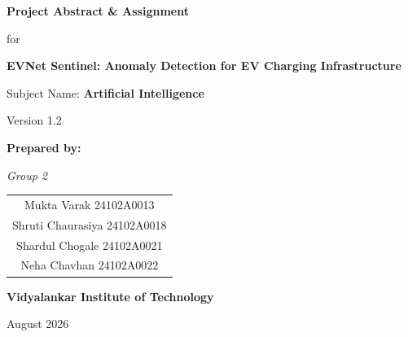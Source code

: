 \documentclass[12pt, a4paper]{article}
\begin{document}
\begin{titlepage}
    \centering
    \vspace*{1.5cm}

    {\Huge \bfseries Project Abstract \& Assignment\par}
    \vspace{0.4cm}
    {\large for\par}
    \vspace{0.6cm}

    {\Huge \bfseries EVNet Sentinel: Anomaly Detection for EV Charging Infrastructure\par}
    
    \vspace{1.5cm}
    {\Large Subject Name: \textbf{Artificial Intelligence}\par}
    \vspace{0.3cm}
    {\large Version 1.2\par}

    \vspace{2cm}

    {\Large \bfseries Prepared by:\par}
    \vspace{0.5cm}
    {\large \textit{Group 2}\par}
    \vspace{0.3cm}
    {\large
    \begin{tabular}{c}
        Mukta Varak \quad 24102A0013 \\
        Shruti Chaurasiya \quad 24102A0018 \\
        Shardul Chogale \quad 24102A0021 \\
        Neha Chavhan \quad 24102A0022 \\
    \end{tabular}
    \par}

    \vfill

    {\Large \bfseries Vidyalankar Institute of Technology\par}
    \vspace{0.2cm}
    {\large August 2026\par}
\end{titlepage}

\newpage

\pagestyle{plain}
\vspace*{1cm}
\end{document}
